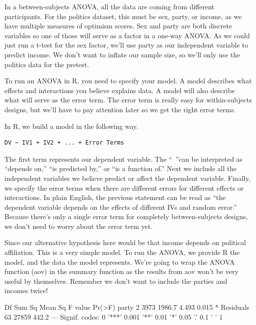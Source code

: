 \documentclass[12pt]{article}
\newcounter{subsubsubsection}[subsubsection]
\begin{document}
In a between-subjects ANOVA, all the data are coming from different participants.
For the politics dataset, this must be sex, party, or income, as we have multiple
measures of optimism scores. Sex and party are both discrete variables so one
of those will serve as a factor in a one-way ANOVA. As we could just run a t-test
for the sex factor, we'll use party as our independent variable to predict
income. We don't want to inflate our sample size, so we'll only use the politics
data for the pretest.

To run an ANOVA in R, you need to specify your model. A model describes what
effects and interactions you believe explains data. A model will also describe
what will serve as the error term. The error term is really easy for within-subjects
designs, but we'll have to pay attention later so we get the right error terms.

In R, we build a model in the following way.

\begin{verbatim}
DV ~ IV1 + IV2 + ... + Error Terms
\end{verbatim}

The first term represents our dependent variable. The ``~''can be interpreted as
``depends on,'' ``is predicted by,'' or ``is a function of.'' Next we include all
the independent variables we believe predict or affect the dependent variable.
Finally, we specify the error terms when there are different errors for different
effects or interactions. In plain English, the previous statement can be read as
``the dependent variable depends on the effects of different IVs and random error.''
Because there's only a single error term for completely
between-subjects designs, we don't need to worry about the error term yet.

Since our alternative hypothesis here would be that income depends on political
affiliation. This is a very simple model. To run the ANOVA, we provide R the model,
and the data the model represents. We're going to wrap the ANOVA function (aov) in
the summary function as the results from aov won't be very useful by themselves.
Remember we don't want to include the parties and incomes twice!

\begin{Schunk}
\begin{Soutput}
            Df Sum Sq Mean Sq F value Pr(>F)  
party        2   3973  1986.7   4.493  0.015 *
Residuals   63  27859   442.2                 
---
Signif. codes:  
0 '***' 0.001 '**' 0.01 '*' 0.05 '.' 0.1 ' ' 1
\end{Soutput}
\end{Schunk}
\end{document}
